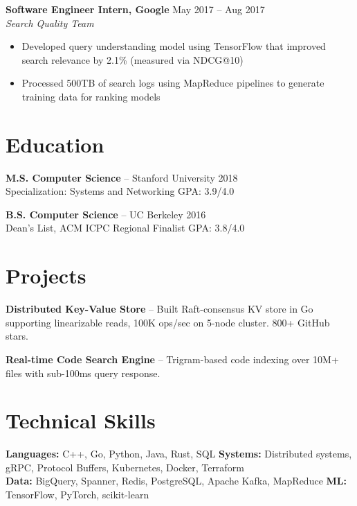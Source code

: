 \documentclass[11pt,letterpaper]{article}
\begin{document}
\textbf{Software Engineer Intern, Google} \hfill {\color{accent}\small May 2017 -- Aug 2017} \\
{\small\itshape Search Quality Team}
\begin{itemize}
    \item Developed query understanding model using TensorFlow that improved search relevance by 2.1\% (measured via NDCG@10)
    \item Processed 500TB of search logs using MapReduce pipelines to generate training data for ranking models
\end{itemize}

\section{Education}

\textbf{M.S. Computer Science} -- Stanford University \hfill {\color{accent}\small 2018} \\
{\small Specialization: Systems and Networking \hfill GPA: 3.9/4.0}

\textbf{B.S. Computer Science} -- UC Berkeley \hfill {\color{accent}\small 2016} \\
{\small Dean's List, ACM ICPC Regional Finalist \hfill GPA: 3.8/4.0}

\section{Projects}

\textbf{Distributed Key-Value Store} -- Built Raft-consensus KV store in Go supporting linearizable reads, 100K ops/sec on 5-node cluster. 800+ GitHub stars.

\textbf{Real-time Code Search Engine} -- Trigram-based code indexing over 10M+ files with sub-100ms query response.

\section{Technical Skills}

{\small
\textbf{Languages:} C++, Go, Python, Java, Rust, SQL \quad
\textbf{Systems:} Distributed systems, gRPC, Protocol Buffers, Kubernetes, Docker, Terraform \\
\textbf{Data:} BigQuery, Spanner, Redis, PostgreSQL, Apache Kafka, MapReduce \quad
\textbf{ML:} TensorFlow, PyTorch, scikit-learn
}
\end{document}
